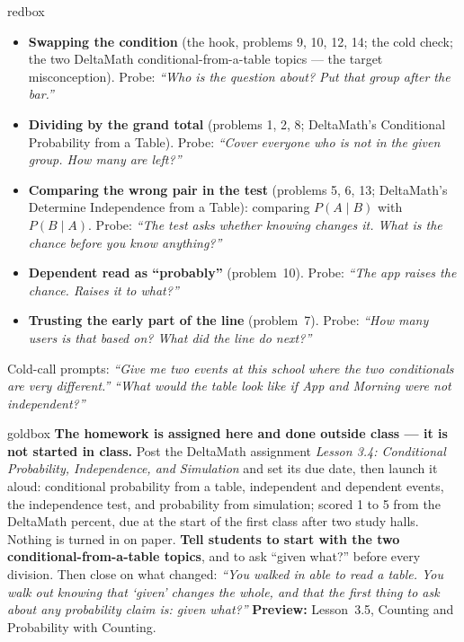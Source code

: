 \documentclass[10pt]{article}
\begin{document}
\boxguard
\begin{skillbox}{redbox}
\begin{itemize}[leftmargin=1.2em, nosep]
  \item \textbf{Swapping the condition} (the hook, problems 9, 10, 12, 14; the cold check; the two
        DeltaMath conditional-from-a-table topics --- the target misconception). Probe: \emph{``Who is the question about? Put that group after the bar.''}
  \item \textbf{Dividing by the grand total} (problems 1, 2, 8; DeltaMath's Conditional Probability from a Table). Probe: \emph{``Cover
        everyone who is not in the given group. How many are left?''}
  \item \textbf{Comparing the wrong pair in the test} (problems 5, 6, 13; DeltaMath's Determine Independence from a Table): comparing
        $P(A \mid B)$ with $P(B \mid A)$. Probe: \emph{``The test asks whether knowing changes it.
        What is the chance before you know anything?''}
  \item \textbf{Dependent read as ``probably''} (problem~10). Probe: \emph{``The app raises the
        chance. Raises it to what?''}
  \item \textbf{Trusting the early part of the line} (problem~7). Probe: \emph{``How many
        users is that based on? What did the line do next?''}
\end{itemize}
Cold-call prompts: \emph{``Give me two events at this school where the two conditionals are very
different.''} \quad \emph{``What would the table look like if App and Morning were not independent?''}
\end{skillbox}

\boxguard
\begin{skillbox}{goldbox}
\textbf{The homework is assigned here and done outside class --- it is not started in class.} Post
the DeltaMath assignment \emph{Lesson 3.4: Conditional Probability, Independence, and Simulation}
and set its due date, then launch it aloud: conditional probability from a table, independent and
dependent events, the independence test, and probability from simulation; scored 1 to 5 from the
DeltaMath percent, due at the start of the first class after two study halls. Nothing is turned in
on paper. \textbf{Tell students to start with the two conditional-from-a-table topics}, and to ask
``given what?'' before every division. Then close on
what changed: \emph{``You walked in able to read a table. You walk out knowing that `given' changes
the whole, and that the first thing to ask about any probability claim is: given what?''}
\textbf{Preview:} Lesson~3.5, Counting and Probability with Counting.
\end{skillbox}
\end{document}
